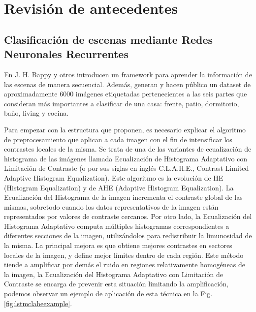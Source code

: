 \section{Revisión de antecedentes}
\subsection{Clasificación de escenas mediante Redes Neuronales Recurrentes}
En \cite{lstm_real_estate} J. H. Bappy y otros introducen un framework para aprender la información de las escenas de manera secuencial. Además, generan y hacen público un dataset de aproximadamente 6000 imágenes etiquetadas pertenecientes a las seis partes que consideran más importantes a clasificar de una casa: frente, patio, dormitorio, baño, living y cocina.

Para empezar con la estructura que proponen, es necesario explicar el algoritmo de preprocesamiento que aplican a cada imagen con el fin de intensificar los contrastes locales de la misma. Se trata de una de las variantes de ecualización de histograma de las imágenes llamada Ecualización de Histograma Adaptativo con Limitación de Contraste (o por sus siglas en inglés C.L.A.H.E., Contrast Limited Adaptive Histogram Equalization). Este algoritmo es la evolución de HE (Histogram Equalization) y de AHE (Adaptive Histogram Equalization). 
La Ecualización del Histograma de la imagen incrementa el contraste global de las mismas, sobretodo cuando los datos representativos de la imagen están representados por valores de contraste cercanos.
Por otro lado, la Ecualización del Histograma Adaptativo computa múltiples histogramas correspondientes a diferentes secciones de la imagen, utilizándolos para redistribuir la limunosidad de la misma. La principal mejora es que obtiene mejores contrastes en sectores locales de la imagen, y define mejor límites dentro de cada región.
Este método tiende a amplificar por demás el ruido en regiones relativamente homogéneas de la imagen, la Ecualización del Histograma Adaptativo con Limitación de Contraste se encarga de prevenir esta situación limitando la amplificación, podemos observar un ejemplo de aplicación de esta técnica en la Fig. \ref{fig:lstmclaheexample}.
